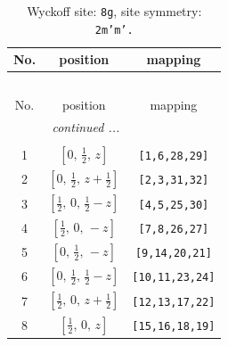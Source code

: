 \documentclass[fleqn,8pt]{jsarticle}
\begin{document}
\begin{longtable}{ccc}
\caption{Wyckoff site: {\tt 8g}, site symmetry: {\tt 2m'm'.}}
 \\
 \hline \hline
No. & position & mapping \\ \hline \endfirsthead

\multicolumn{2}{l}{\tablename\ \thetable{}} \\
 \hline \hline
No. & position & mapping \\ \hline \endhead

 \hline \hline
\multicolumn{2}{r}{\footnotesize\it continued ...} \\ \endfoot

 \hline \hline
\multicolumn{2}{r}{} \\ \endlastfoot

1 & $\left[ 0,\, \frac{1}{2},\, z \right]$ & {\tt [1,6,28,29]} \\ \hline
2 & $\left[ 0,\, \frac{1}{2},\, z + \frac{1}{2} \right]$ & {\tt [2,3,31,32]} \\ \hline
3 & $\left[ \frac{1}{2},\, 0,\, \frac{1}{2} - z \right]$ & {\tt [4,5,25,30]} \\ \hline
4 & $\left[ \frac{1}{2},\, 0,\, - z \right]$ & {\tt [7,8,26,27]} \\ \hline
5 & $\left[ 0,\, \frac{1}{2},\, - z \right]$ & {\tt [9,14,20,21]} \\ \hline
6 & $\left[ 0,\, \frac{1}{2},\, \frac{1}{2} - z \right]$ & {\tt [10,11,23,24]} \\ \hline
7 & $\left[ \frac{1}{2},\, 0,\, z + \frac{1}{2} \right]$ & {\tt [12,13,17,22]} \\ \hline
8 & $\left[ \frac{1}{2},\, 0,\, z \right]$ & {\tt [15,16,18,19]} \\
\end{longtable}
\renewcommand{\arraystretch}{1.2}
\end{document}
